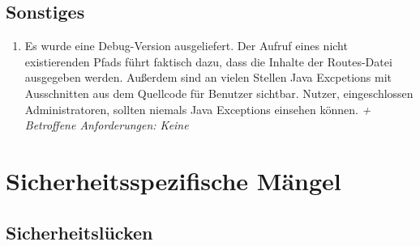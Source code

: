 \documentclass[12pt,DIV14,BCOR10mm,a4paper,parskip=half-,headsepline,headinclude,english,ngerman,bibliography=totocnumbered]{scrreprt}
\begin{document}
\section{Sonstiges}

\begin{enumerate}[resume]




  \item Es wurde eine Debug-Version ausgeliefert. Der Aufruf eines nicht existierenden Pfads führt faktisch dazu, dass die Inhalte der Routes-Datei ausgegeben werden. Außerdem sind an vielen Stellen Java Excpetions mit Ausschnitten aus dem Quellcode für Benutzer sichtbar. Nutzer, eingeschlossen Administratoren, sollten niemals Java Exceptions einsehen können.\newline
  \textit{+ Betroffene Anforderungen: Keine}


\end{enumerate}

\chapter{Sicherheitsspezifische Mängel}

\section{Sicherheitslücken}
\end{document}
